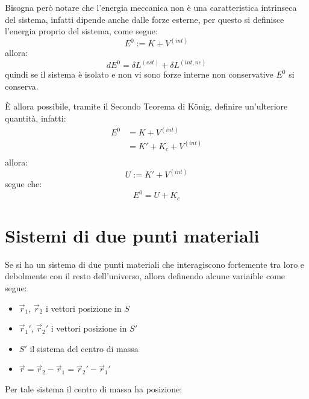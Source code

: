 \documentclass[11pt, a4paper, openright]{book}
\theoremstyle{plain}
\theoremstyle{definition}
\begin{document}
Bisogna però notare che l'energia meccanica non è una caratteristica intrinseca del sistema, infatti dipende anche dalle forze esterne, per questo si definisce l'energia proprio del sistema, come segue:
\begin{equation}
    E^{0} := K + V^{(int)}
\end{equation}
allora:
\begin{equation}
    dE^0 = \delta L^{(est)} + \delta L^{(int, nc)}
\end{equation}
quindi se il sistema è isolato e non vi sono forze interne non conservative $E^0$ si conserva.

È allora possibile, tramite il Secondo Teorema di K\"onig, definire un'ulteriore quantità, infatti:
\begin{align}
    E^0 & = K + V^{(int)} \\
        & = K'+ K_c + V^{(int)} \\
\end{align}
allora:
\begin{equation}
    U := K' + V^{(int)}
\end{equation}
segue che:
\begin{equation}
    E^0 = U + K_c
\end{equation}

\section{Sistemi di due punti materiali}
Se si ha un sistema di due punti materiali che interagiscono fortemente tra loro e debolmente con il resto dell'universo, allora definendo alcune variaible come segue:
\begin{itemize}
    \item $\vec{r}_1$, $\vec{r}_2$ i vettori posizione in $S$
    \item $\vec{r}_1'$, $\vec{r}_2'$ i vettori posizione in $S'$
    \item $S'$ il sistema del centro di massa
    \item $\vec{r} = \vec{r}_2 - \vec{r}_1 = \vec{r}_2' - \vec{r}_1'$
\end{itemize}
Per tale sistema il centro di massa ha posizione:
\end{document}
